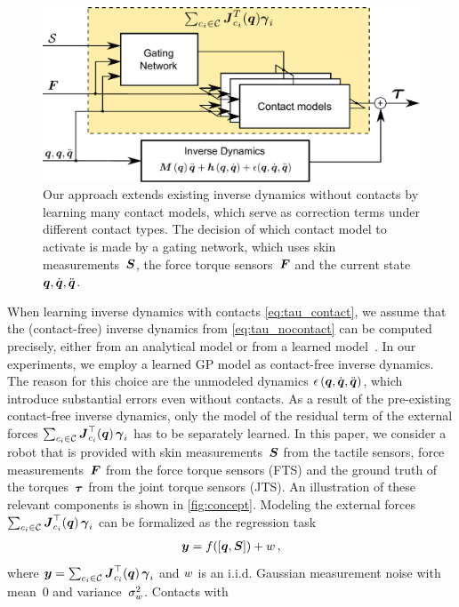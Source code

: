 \begin{figure}[t]
	\centering
	\includegraphics[width =.7\linewidth]{robertoICRA/fig/diagram_2.pdf}
	\caption{Our approach extends existing inverse dynamics without contacts by learning many contact models, which serve as correction terms under different contact types. The decision of which contact model to activate is made by a gating network, which uses skin measurements~$\mathcal{\boldsymbol{S}}$, the force torque sensors~$\boldsymbol{F}$ and the current state $\boldsymbol q, \dot{\boldsymbol q}, \ddot{\boldsymbol q}$.}
	\label{fig:model}
\end{figure}
When learning inverse dynamics with contacts \eq\eqref{eq:tau_contact},
we assume that the (contact-free) inverse dynamics from
\eq\eqref{eq:tau_nocontact} can be computed precisely, either from an analytical
model or from a learned model~\cite{Nguyen-Tuong2011}. In our experiments, we
employ a learned GP model as contact-free inverse dynamics. The reason for this
choice are the unmodeled dynamics $\epsilon\,(\boldsymbol q,\dot{\boldsymbol q},\ddot{\boldsymbol q})$, which introduce
substantial errors even without contacts. As a result of the pre-existing
contact-free inverse dynamics, only the model of the residual term of the
external forces $\sum_{c_i \in\mathcal{C}} {\boldsymbol J^\top_{c_i}(\boldsymbol q)}\,
\boldsymbol{\gamma}_i$ has to be separately learned. In this paper, we consider a robot
that is provided with skin measurements~$\mathcal{\boldsymbol{S}}$ from the tactile sensors,
force measurements~$\boldsymbol{F}$ from the force torque sensors (FTS) and the
ground truth of the torques~$\boldsymbol{\tau}$ from the joint torque sensors (JTS). An
illustration of these relevant components is shown in \fig\ref{fig:concept}.
Modeling the external forces $\sum_{c_i \in\mathcal{C}}
{\boldsymbol J^\top_{c_i}(\boldsymbol q)}\, \boldsymbol{\gamma}_i$ can be formalized as the regression task
\begin{align}
	\boldsymbol y = f([\boldsymbol q, \mathcal{\boldsymbol{S}}]) + w\,,
	\label{eq:regression}
\end{align}   
where $\boldsymbol y = \sum_{c_i \in\mathcal{C}}
{\boldsymbol J^\top_{c_i}(\boldsymbol q)}\, \boldsymbol{\gamma}_i$ and  $w$ is an i.i.d. Gaussian
measurement noise with mean~$0$ and variance~$\sigma_w^2$. Contacts with
